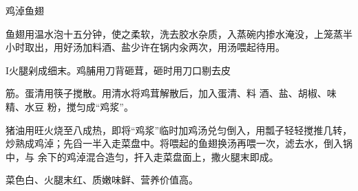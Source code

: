 \begin{recipe}{鸡淖鱼翅}

\ingredients


\cooking

\step 鱼翅用温水泡十五分钟，使之柔软，洗去胶水杂质，入蒸碗内掺水淹没，上笼蒸半
小时取出，用好汤加料酒、盐少许在锅内汆两次，用汤喂起待用。

I火腿剁成细末。鸡脯用刀背砸茸，砸时用刀口剔去皮

筋。蛋清用筷子搅散。用清水将鸡茸解散后，加入蛋清、料 酒、盐、胡椒、味精、水豆
粉，搅匀成“鸡浆”。

\step 猪油用旺火烧至八成热，即将“鸡浆”临时加鸡汤兑匀倒入，用瓢子轻轻搅推几转，
炒熟成鸡淖；先舀一半入走菜盘中。将喂起的鱼翅换汤再喂一次，滤去水，倒入锅中，与
余下的鸡淖混合造匀，扞入走菜盘面上，撒火腿末即成。

\notes

菜色白、火腿末红、质嫩味鲜、营养价值高。

\end{recipe}

